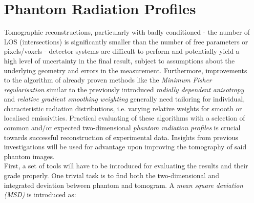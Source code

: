     \section{Phantom Radiation Profiles}\label{sec:phantoms}%
%
        Tomographic reconstructions, particularly with badly conditioned - the number of LOS (intersections) is significantly smaller than the number of free parameters or pixels/voxels - detector systems are difficult to perform and potentially yield a high level of uncertainty in the final result, subject to assumptions about the underlying geometry and errors in the measurement. Furthermore, improvements to the algorithm of already proven methods like the \textit{Minimum Fisher regularisation} similar to the previously introduced \textit{radially dependent anisotropy} and \textit{relative gradient smoothing weighting} generally need tailoring for individual, characteristic radiation distributions, i.e. varying relative weights for smooth or localised emissivities. Practical evaluating of these algorithms with a selection of common and/or expected two-dimensional \textit{phantom radiation profiles} is crucial towards successful reconstruction of experimental data. Insights from previous investigations will be used for advantage upon improving the tomography of said phantom images.\\%
        First, a set of tools will have to be introduced for evaluating the results and their grade properly. One trivial task is to find both the two-dimensional and integrated deviation between phantom and tomogram. A \textit{mean square deviation (MSD)} is introduced as:%

